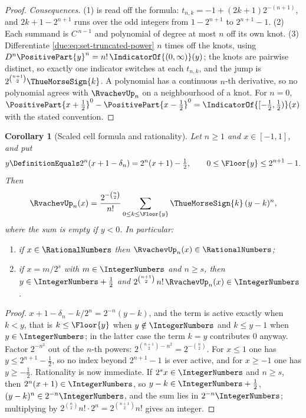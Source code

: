 \documentclass[11pt,oneside]{article}
\theoremstyle{plain}
\newtheorem{corollary}[theorem]{Corollary}
\theoremstyle{definition}
\theoremstyle{remark}
\newcommand{\Kk}{\RationalNumbers}                          %
\newcommand{\upn}[1]{\RvachevUp_{#1}}
\begin{document}
\begin{proof}
\emph{Consequences.}
(1) is read off the formula: $t_{n,k}=-1+(2k+1)2^{-(n+1)}$, and
$2k+1-2^{n+1}$ runs over the odd integers from $1-2^{n+1}$ to $2^{n+1}-1$.
(2) Each summand is $C^{\,n-1}$ and polynomial of degree at most $n$ off its
own knot.  (3) Differentiate \cref{due:eq:set-truncated-power} $n$ times off
the knots, using $D^{n}\PositivePart{y}^{n}=n!\,\IndicatorOf{(0,\infty)}(y)$;
the knots are pairwise distinct, so exactly one indicator switches at each
$t_{n,k}$, and the jump is $2^{\binom{n+1}{2}}\ThueMorseSign{k}$.  A
polynomial has a continuous $n$-th derivative, so no polynomial agrees with
$\upn{n}$ on a neighbourhood of a knot.
For $n=0$, $\PositivePart{x+\tfrac12}^{0}-\PositivePart{x-\tfrac12}^{0}
=\IndicatorOf{[-\frac12,\frac12)}(x)$ with the stated convention.
\end{proof}

\begin{corollary}[Scaled cell formula and rationality]
\label{due:cor:set-scaled-cell}
Let $n\ge1$ and $x\in[-1,1]$, and put
\begin{equation}
 y\DefinitionEquals 2^{n}(x+1-\delta_n)=2^{n}(x+1)-\tfrac12,
 \qquad 0\le\Floor{y}\le2^{n+1}-1 .
 \label{due:eq:set-scaled-coordinate}
\end{equation}
Then
\begin{equation}
 \upn{n}(x)=\frac{2^{-\binom{n}{2}}}{n!}
 \sum_{0\le k\le\Floor{y}}\ThueMorseSign{k}\,(y-k)^{n},
 \label{due:eq:set-scaled-cell}
\end{equation}
where the sum is empty if $y<0$.  In particular:
\begin{enumerate}
\item if $x\in\RationalNumbers$ then $\upn{n}(x)\in\Kk$;
\item if $x=m/2^{s}$ with $m\in\IntegerNumbers$ and $n\ge s$, then
      $y\in\IntegerNumbers+\frac12$ and
      $2^{\binom{n+1}{2}}\,n!\,\upn{n}(x)\in\IntegerNumbers$.
\end{enumerate}
\end{corollary}

\begin{proof}
$x+1-\delta_n-k/2^{n}=2^{-n}(y-k)$, and the term is active exactly when
$k<y$, that is $k\le\Floor{y}$ when $y\notin\IntegerNumbers$ and
$k\le y-1$ when $y\in\IntegerNumbers$; in the latter case the term $k=y$
contributes $0$ anyway.  Factor $2^{-n^2}$ out of the $n$-th powers:
$2^{\binom{n+1}{2}-n^{2}}=2^{-\binom n2}$.  For $x\le1$ one has
$y\le2^{n+1}-\frac12$, so no index beyond $2^{n+1}-1$ is ever active, and
for $x\ge-1$ one has $y\ge-\frac12$.  Rationality is now immediate.  If
$2^{s}x\in\IntegerNumbers$ and $n\ge s$, then $2^{n}(x+1)\in\IntegerNumbers$,
so $y-k\in\IntegerNumbers+\frac12$, $(y-k)^{n}\in2^{-n}\IntegerNumbers$, and
the sum lies in $2^{-n}\IntegerNumbers$; multiplying by
$2^{\binom n2}n!\cdot2^{n}=2^{\binom{n+1}{2}}n!$ gives an integer.
\end{proof}
\end{document}
